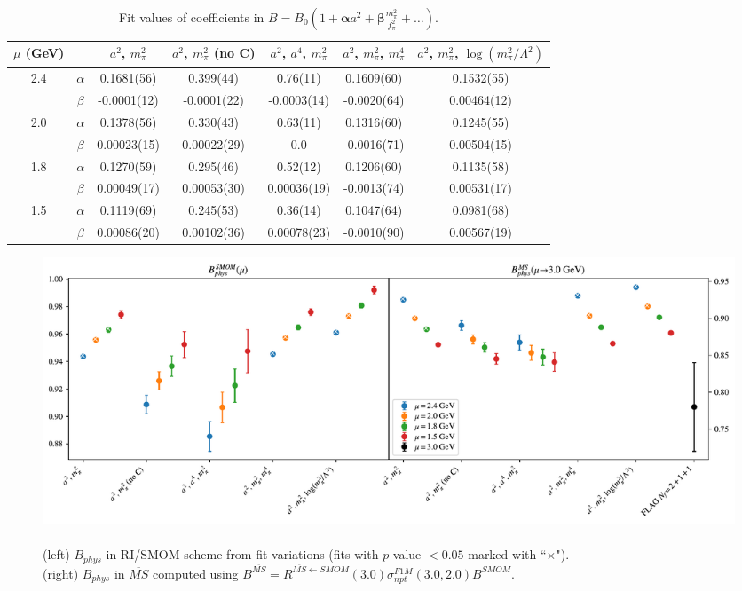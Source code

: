 \documentclass[12pt]{extarticle}
\begin{document}
\begin{table}[h!]
\begin{center}
\begin{tabular}{|c c|c|c|c|c|c|}
\hline
$\mu$ (GeV) &  & $a^2$, $m_\pi^2$& $a^2$, $m_\pi^2$ (no C)& $a^2$, $a^4$, $m_\pi^2$& $a^2$, $m_\pi^2$, $m_\pi^4$& $a^2$, $m_\pi^2$, $\log(m_\pi^2/\Lambda^2)$\\
\hline
\multirow{2}{0.5in}{2.4} & $\alpha$ & 0.1681(56)& 0.399(44)& 0.76(11)& 0.1609(60)& 0.1532(55)\\
 & $\beta$ & -0.0001(12)& -0.0001(22)& -0.0003(14)& -0.0020(64)& 0.00464(12)\\
\hline
\multirow{2}{0.5in}{2.0} & $\alpha$ & 0.1378(56)& 0.330(43)& 0.63(11)& 0.1316(60)& 0.1245(55)\\
 & $\beta$ & 0.00023(15)& 0.00022(29)& 0.0& -0.0016(71)& 0.00504(15)\\
\hline
\multirow{2}{0.5in}{1.8} & $\alpha$ & 0.1270(59)& 0.295(46)& 0.52(12)& 0.1206(60)& 0.1135(58)\\
 & $\beta$ & 0.00049(17)& 0.00053(30)& 0.00036(19)& -0.0013(74)& 0.00531(17)\\
\hline
\multirow{2}{0.5in}{1.5} & $\alpha$ & 0.1119(69)& 0.245(53)& 0.36(14)& 0.1047(64)& 0.0981(68)\\
 & $\beta$ & 0.00086(20)& 0.00102(36)& 0.00078(23)& -0.0010(90)& 0.00567(19)\\
\hline
\end{tabular}
\caption{Fit values of coefficients in $B = B_0(1 + \mathbf{\alpha} a^2 + \mathbf{\beta} \frac{m_\pi^2}{f_\pi^2} + \ldots)$.}
\end{center}
\end{table}
\begin{figure}
\centering
\includegraphics[page=1, width=1.1\textwidth]{plots/SSpPP_fit_summary.pdf}
\caption{\\(left) $B_{phys}$ in RI/SMOM scheme from fit variations (fits with $p$-value $<0.05$ marked with ``$\times$"). \\(right) $B_{phys}$ in $\overline{MS}$ computed using $B^{\overline{MS}} = R^{\overline{MS}\leftarrow SMOM}(3.0)\sigma_{npt}^{F1M}(3.0, 2.0) B^{SMOM}$.}
\end{figure}
\end{document}
